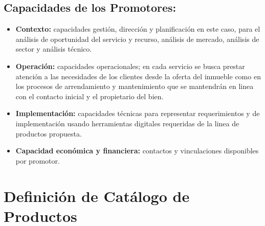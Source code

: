 \documentclass[letterpaper]{article}
\begin{document}
\subsection{\textbf{Capacidades de los Promotores:}}%
\begin{itemize}   
    \item \textbf{Contexto:} capacidades gestión, dirección y planificación en este caso, para el análisis  de oportunidad del servicio y recurso, análisis de mercado, análisis de sector y análisis técnico.
    \item \textbf{Operación:} capacidades operacionales; en cada servicio se busca prestar atención a las necesidades de los clientes desde la oferta del inmueble como en los procesos de arrendamiento y mantenimiento que se mantendrán en linea con el contacto inicial y el propietario del bien.
    \item \textbf{Implementación:} capacidades técnicas para representar requerimientos y de implementación usando  herramientas digitales requeridas de la linea de productos propuesta.
    \item \textbf{Capacidad económica y financiera:} contactos y vinculaciones disponibles por promotor. 
\end{itemize}





\section{\textbf{Definición de Catálogo de Productos}}
\end{document}

